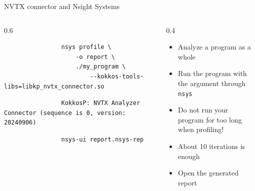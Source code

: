 \documentclass[
    aspectratio=169,
    \createHandout
]{beamer}
\begin{document}
\begin{frame}[fragile]{NVTX connector and Nsight Systems}
    \begin{columns}
        \begin{column}{0.6\linewidth}
            \begin{verbatim}
                nsys profile \
                    -o report \
                    ./my_program \
                        --kokkos-tools-libs=libkp_nvtx_connector.so
            \end{verbatim}

            \begin{verbatim}
                KokkosP: NVTX Analyzer Connector (sequence is 0, version: 20240906)
            \end{verbatim}

            \begin{verbatim}
                nsys-ui report.nsys-rep
            \end{verbatim}
        \end{column}
        \begin{column}{0.4\linewidth}
            \begin{itemize}
                \item Analyze a program as a whole
                \item Run the program with the argument through \texttt{nsys}
                \item Do not run your program for too long when profiling!
                \item About 10 iterations is enough
                \item Open the generated report
            \end{itemize}
        \end{column}
    \end{columns}
\end{frame}
\end{document}
